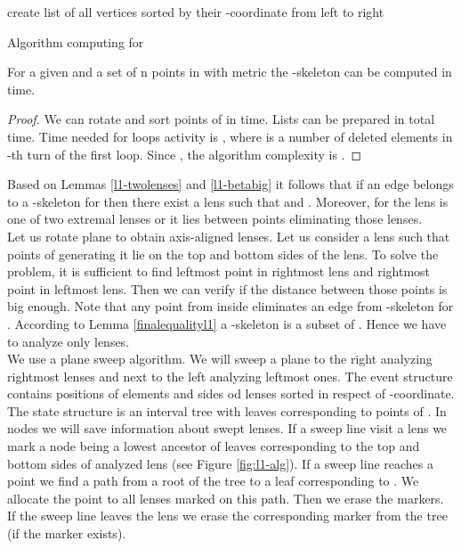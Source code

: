 \documentclass[11pt]{llncs}
\begin{document}
\begin{algorithm}[H]
\footnotesize{
\BlankLine
create list  of all vertices sorted by their -coordinate from left to right\;


}
\caption{Algorithm computing  for  }
\label{alg-1} 
\end{algorithm}  

\begin{theorem}
For a given  and a set  of n points in  with  metric the -skeleton
 can be computed in  time.
\end{theorem}
\begin{proof}
We can rotate and sort points of  in  time. Lists  can be prepared 
in total  time. Time needed for loops activity is , where
 is a number of deleted elements in -th turn of the first loop. 
Since , the algorithm complexity is .
\end{proof}


Based on Lemmas \ref{l1-twolenses} and \ref{l1-betabig} it follows that if an edge 
belongs to a -skeleton for  then there exist a lens 
such that  and .
Moreover, for  the lens  is one of two extremal lenses
or it lies between points eliminating those lenses. \\
Let us rotate plane to obtain axis-aligned lenses. Let us consider a lens such that points of 
generating it lie on the top and bottom sides of the lens. To solve the problem, it is sufficient 
to find leftmost point in rightmost lens and rightmost point in leftmost lens. Then we can verify
if the distance between those points is big enough. Note that any point from  inside
 eliminates an edge  from -skeleton for .
According to Lemma \ref{finalequalityl1} a -skeleton is a subset of .
Hence we have to analyze only  lenses. \\
We use a plane sweep algorithm. We will sweep a plane to the right analyzing rightmost lenses
and next to the left analyzing leftmost ones. The event structure contains positions of  
elements and sides od lenses sorted in respect of -coordinate. The state structure is 
an interval tree with  leaves corresponding to points of . In nodes we will save 
information about swept lenses. If a sweep line visit a lens we mark a node being a lowest 
ancestor of leaves corresponding to the top and bottom sides of analyzed lens 
(see Figure \ref{fig:l1-alg}). 
If a sweep line reaches a point  we find a path from a root of the tree to a leaf 
corresponding to . We allocate the point to all lenses marked on this path. Then we erase
the markers. If the sweep line leaves the lens we erase the corresponding marker from the tree
(if the marker exists).  
\end{document}
